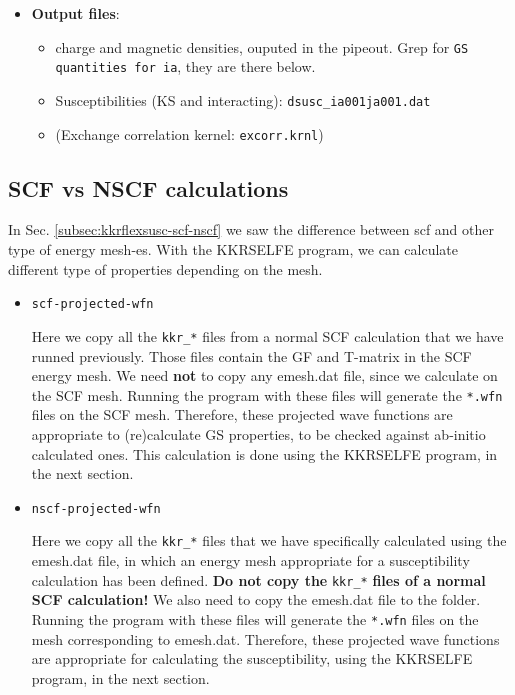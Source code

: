 \documentclass[11pt,fleqn]{book} %
\begin{document}
\begin{itemize}
\begin{itemize}
\end{itemize}


\item \textbf{Output files}:

\begin{itemize}

 \item charge and magnetic densities, ouputed in the pipeout. Grep for
 \verb|GS quantities for ia|, they are there below.

 \item Susceptibilities (KS and interacting): \verb|dsusc_ia001ja001.dat|

 \item (Exchange correlation kernel: \verb|excorr.krnl|)


\end{itemize}

\end{itemize}

\subsection{SCF vs NSCF calculations}
\label{subsec:kkrselfe-scf-nscf}

In Sec. \ref{subsec:kkrflexsusc-scf-nscf} we saw the difference between scf and
other type of energy mesh-es. With the KKRSELFE program, we can calculate
different type of properties depending on the mesh.

\begin{itemize}

\item \verb|scf-projected-wfn|

Here we copy all the \verb|kkr_*| files from a normal SCF calculation
that we have runned previously. Those files contain the GF and T-matrix
in the SCF energy mesh. We need \textbf{not} to copy any emesh.dat file,
since we calculate on the SCF mesh. Running the program with these files
will generate the \verb|*.wfn|
files on the SCF mesh. Therefore, these projected wave functions are appropriate
to (re)calculate GS properties, to be checked against ab-initio calculated ones.
This calculation is done using the KKRSELFE program, in the next section.

\item \verb|nscf-projected-wfn|

Here we copy all the \verb|kkr_*| files that we have specifically
calculated using the emesh.dat file, in which an energy mesh appropriate
for a susceptibility calculation has been defined.
\textbf{Do not copy the} \verb|kkr_*| \textbf{files of a normal SCF calculation!}
We also need to copy the
emesh.dat file to the folder. Running the program with these files
will generate the \verb|*.wfn|
files on the mesh corresponding to emesh.dat. Therefore, these projected wave
functions are appropriate for calculating the susceptibility,
using the KKRSELFE program, in the next section.

\end{itemize}
\end{document}
